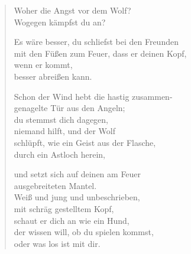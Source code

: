 
\cleartoverso


\begin{verse}

Woher die Angst vor dem Wolf?\\
Wogegen kämpfst du an?

Es wäre besser, du schliefst bei den Freunden\\
mit den Füßen zum Feuer, dass er deinen Kopf,\\
wenn er kommt,\\
besser abreißen kann.

Schon der Wind hebt die hastig zusammen-\\
genagelte Tür aus den Angeln;\\
du stemmst dich dagegen,\\
niemand hilft, und der Wolf\\
schlüpft, wie ein Geist aus der Flasche,\\
durch ein Astloch herein,

und setzt sich auf deinen am Feuer\\
ausgebreiteten Mantel.\\
Weiß und jung und unbeschrieben,\\
mit schräg gestelltem Kopf,\\
schaut er dich an wie ein Hund,\\
der wissen will, ob du spielen kommst,\\
oder was los ist mit dir.
\end{verse}

\clearpage


